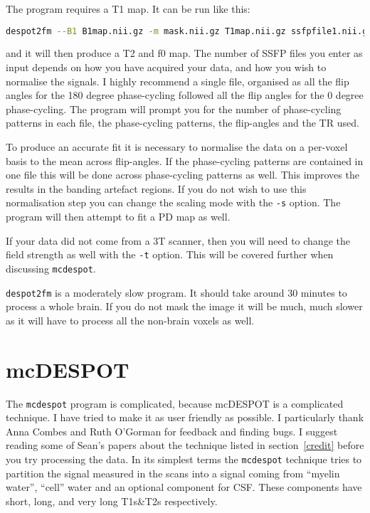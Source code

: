 \documentclass{report}
\begin{document}
The program requires a T1 map. It can be run like this:

\begin{lstlisting}[language=sh]
despot2fm --B1 B1map.nii.gz -m mask.nii.gz T1map.nii.gz ssfpfile1.nii.gz ssfpfile2.nii.gz
\end{lstlisting}

and it will then produce a T2 and f0 map. The number of SSFP files you enter as input depends on how you have acquired your data, and how you wish to normalise the signals. I highly recommend a single file, organised as all the flip angles for the 180 degree phase-cycling followed all the flip angles for the 0 degree phase-cycling. The program will prompt you for the number of phase-cycling patterns in each file, the phase-cycling patterns, the flip-angles and the TR used.

To produce an accurate fit it is necessary to normalise the data on a per-voxel basis to the mean across flip-angles. If the phase-cycling patterns are contained in one file this will be done across phase-cycling patterns as well. This improves the results in the banding artefact regions. If you do not wish to use this normalisation step you can change the scaling mode with the \texttt{-s} option. The program will then attempt to fit a PD map as well.

If your data did not come from a 3T scanner, then you will need to change the field strength as well with the \texttt{-t} option. This will be covered further when discussing \texttt{mcdespot}.

\texttt{despot2fm} is a moderately slow program. It should take around 30 minutes to process a whole brain. If you do not mask the image it will be much, much slower as it will have to process all the non-brain voxels as well.

\section{mcDESPOT}

The \texttt{mcdespot} program is complicated, because mcDESPOT is a complicated technique. I have tried to make it as user friendly as possible. I particularly thank Anna Combes and Ruth O'Gorman for feedback and finding bugs. I suggest reading some of Sean's papers about the technique listed in section~\ref{credit} before you try processing the data. In its simplest terms the \texttt{mcdespot} technique tries to partition the signal measured in the scans into a signal coming from ``myelin water'', ``cell'' water and an optional component for CSF. These components have short, long, and very long T1s\&T2s respectively.
\end{document}
